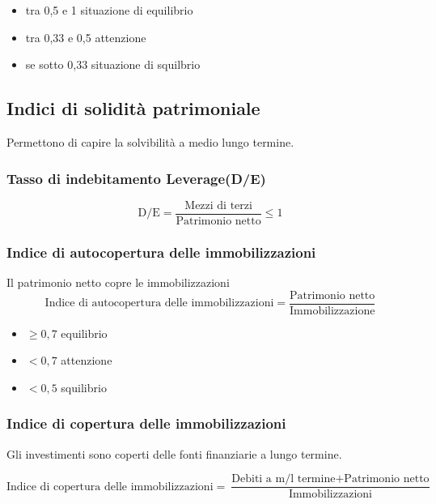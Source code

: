 \begin{itemize}
    \item tra 0,5 e 1 situazione di equilibrio
    \item tra 0,33 e 0,5 attenzione
    \item se sotto 0,33 situazione di squilbrio
\end{itemize}

\subsection{Indici di solidità patrimoniale}
Permettono di capire la solvibilità a medio lungo termine.

\subsubsection{Tasso di indebitamento Leverage(D/E)}
\begin{equation*}
    \text{D/E} = \frac{\text{Mezzi di terzi}}{\text{Patrimonio netto}} \leq 1
\end{equation*}

\subsubsection{Indice di autocopertura delle immobilizzazioni}
Il patrimonio netto copre le immobilizzazioni
\begin{equation*}
    \text{Indice di autocopertura delle immobilizzazioni} = \frac{\text{Patrimonio netto}}{\text{Immobilizzazione}}
\end{equation*}

\begin{itemize}
    \item $\geq 0,7$ equilibrio
    \item $< 0,7$ attenzione
    \item $< 0,5$ squilibrio
\end{itemize}

\subsubsection{Indice di copertura delle immobilizzazioni}
Gli investimenti sono coperti delle fonti finanziarie a lungo termine.

\begin{equation*}
    \text{Indice di copertura delle immobilizzazioni} = 
    \frac{
        \text{Debiti a m/l termine} + \text{Patrimonio netto}
    }{
        \text{Immobilizzazioni}
    }
\end{equation*}

